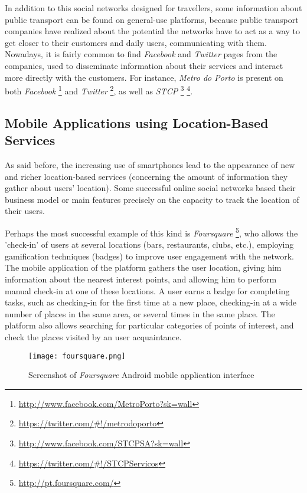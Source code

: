 In addition to this social networks designed for travellers, some information about public transport can be found on general-use platforms, because public transport companies have realized about the potential the networks have to act as a way to get closer to their customers and daily users, communicating with them.
Nowadays, it is fairly common to find \emph{Facebook} and \emph{Twitter} pages from the companies, used to disseminate information about their services and interact more directly with the customers.
For instance, \emph{Metro do Porto} is present on both \emph{Facebook} \footnote{\url{http://www.facebook.com/MetroPorto?sk=wall}} and \emph{Twitter} \footnote{\url{https://twitter.com/\#!/metrodoporto}}, as well as \emph{STCP} \footnote{\url{http://www.facebook.com/STCPSA?sk=wall}} \footnote{\url{https://twitter.com/\#!/STCPServicos}}.

\subsection{Mobile Applications using Location-Based Services}

As said before, the increasing use of smartphones lead to the appearance of new and richer location-based services (concerning the amount of information they gather about users' location). Some successful online social networks based their business model or main features precisely on the capacity to track the location of their users.

Perhaps the most successful example of this kind is \emph{Foursquare} \footnote{\url{http://pt.foursquare.com/}}, who allows the 'check-in' of users at several locations (bars, restaurants, clubs, etc.), employing gamification techniques (badges) to improve user engagement with the network. The mobile application of the platform gathers the user location, giving him information about the nearest interest points, and allowing him to perform manual check-in at one of these locations.
A user earns a badge for completing tasks, such as checking-in for the first time at a new place, checking-in at a wide number of places in the same area, or several times in the same place. The platform also allows searching for particular categories of points of interest, and check the places visited by an user acquaintance.

\begin{figure}[h!]
  \begin{center}
    \leavevmode
    \texttt{[image: foursquare.png]}
    \caption{Screenshot of \emph{Foursquare} Android mobile application interface}
    \label{fig:fsqr}
  \end{center}
\end{figure}


